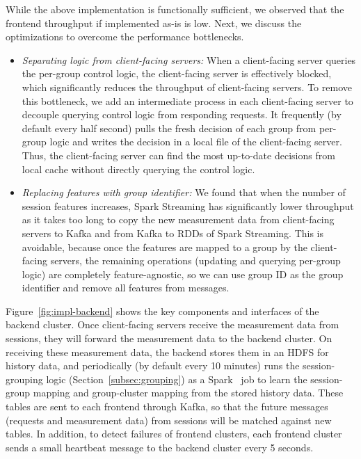 While the above implementation is functionally sufficient, we observed that 
 the frontend throughput if implemented as-is is low. Next, we discuss 
 the optimizations to overcome the performance bottlenecks.
\begin{itemize}
\item{\em Separating logic from client-facing servers:}
When a client-facing server queries the per-group control logic, the client-facing server is effectively blocked, which significantly reduces the throughput of client-facing servers.
To remove this bottleneck, we add an intermediate process in each client-facing server to decouple querying control logic from responding requests.
It frequently (by default every half second) pulls the fresh decision of each group from per-group logic and writes the decision in a local file of the client-facing server. 
Thus, the client-facing server can find the most up-to-date decisions from local cache without directly querying the control logic.
\item{\em Replacing features with group identifier:}
We found that when the number of session features increases, Spark Streaming has significantly lower throughput as it takes too long to copy the new measurement data from client-facing servers to Kafka and from Kafka to RDDs of Spark Streaming.
This is avoidable, because once the features are mapped to a group by the client-facing servers, the remaining operations (updating and querying per-group logic) are completely feature-agnostic, so we can use group ID as the group identifier and remove all features from messages. 
\end{itemize}


Figure~\ref{fig:impl-backend} shows the key components and interfaces of the backend cluster.
Once client-facing servers receive the measurement data from sessions, they will forward the measurement data to the backend cluster.
On receiving these measurement data, the backend stores them in an HDFS for history data, and periodically (by default every 10 minutes) runs the session-grouping logic (Section~\ref{subsec:grouping}) as a Spark~\cite{spark} job to learn the session-group mapping and group-cluster mapping from the stored history data.
These tables are sent to each frontend through Kafka, so that the future messages (requests and measurement data) from sessions will be matched against new tables.
In addition, to detect failures of frontend clusters, each frontend cluster sends a small heartbeat message to the backend cluster every 5 seconds.




